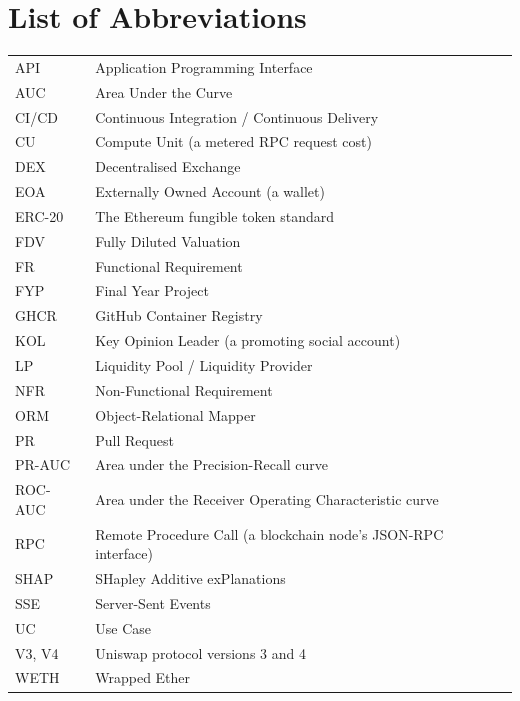 \chapter*{List of Abbreviations}
\begin{tabular}{ll}
API & Application Programming Interface\\
AUC & Area Under the Curve\\
CI/CD & Continuous Integration / Continuous Delivery\\
CU & Compute Unit (a metered RPC request cost)\\
DEX & Decentralised Exchange\\
EOA & Externally Owned Account (a wallet)\\
ERC-20 & The Ethereum fungible token standard\\
FDV & Fully Diluted Valuation\\
FR & Functional Requirement\\
FYP & Final Year Project\\
GHCR & GitHub Container Registry\\
KOL & Key Opinion Leader (a promoting social account)\\
LP & Liquidity Pool / Liquidity Provider\\
NFR & Non-Functional Requirement\\
ORM & Object-Relational Mapper\\
PR & Pull Request\\
PR-AUC & Area under the Precision-Recall curve\\
ROC-AUC & Area under the Receiver Operating Characteristic curve\\
RPC & Remote Procedure Call (a blockchain node's JSON-RPC interface)\\
SHAP & SHapley Additive exPlanations\\
SSE & Server-Sent Events\\
UC & Use Case\\
V3, V4 & Uniswap protocol versions 3 and 4\\
WETH & Wrapped Ether\\
\end{tabular}
